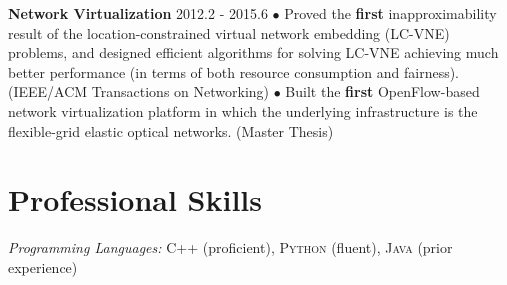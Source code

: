 \documentclass[line,11pt,letter]{/home/saber/GitHub/personal-resume/includes/cls/myRes}
\begin{document}
\begin{resume}
{}
{\setlength{\parskip}{0pt}
{\bf Network Virtualization} \hfill 2012.2 - 2015.6\break
{\hspace*{1em} $\bullet$ Proved the {\bf first} inapproximability result of the location-constrained virtual network embedding (LC-VNE) problems, and designed efficient algorithms for solving LC-VNE achieving much better performance (in terms of both resource consumption and fairness). (IEEE/ACM Transactions on Networking)\hfill\break}
{\hspace*{1em} $\bullet$ Built the {\bf first} OpenFlow-based network virtualization platform in which the underlying infrastructure is the flexible-grid elastic optical networks. (Master Thesis)\hfill\break}
}
\negspace
\section{Professional Skills}
\vspace{-4pt}
\setlength{\parskip}{0pt}
{\sl Programming Languages:} \textsc{C++} (proficient), \textsc{Python} (fluent), \textsc{Java} (prior experience)\\
\vspace*{4pt}
\negspace
% 
\end{resume}
\end{document}
